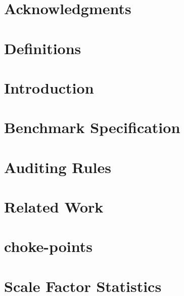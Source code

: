 \documentclass{ldbc}
\begin{document}
\maketitle

\chapter*{Acknowledgments}


\listoffigures
\listoftables
\chapter*{Definitions}


\chapter{Introduction}


\chapter{Benchmark Specification}


%
%
%

\chapter{Auditing Rules}\label{chapter:auditing}


\chapter{Related Work}





\appendix

\chapter{choke-points}



\chapter{Scale Factor Statistics}

\end{document}
